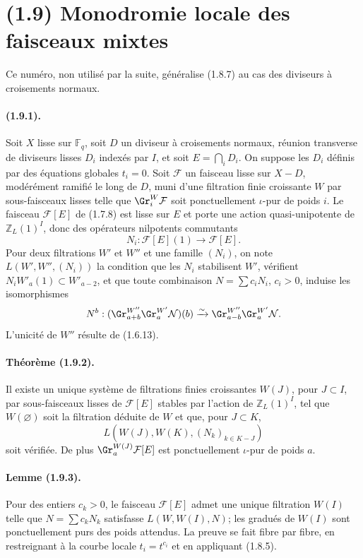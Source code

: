 
\section*{(1.9) Monodromie locale des faisceaux mixtes}

Ce numéro, non utilisé par la suite, généralise (1.8.7) au cas des diviseurs à croisements normaux.

\paragraph{(1.9.1).}
Soit $X$ lisse sur $\mathbb F_q$, soit $D$ un diviseur à croisements normaux, réunion transverse de diviseurs lisses $D_i$ indexés par $I$, et soit $E=\bigcap_iD_i$. On suppose les $D_i$ définis par des équations globales $t_i=0$. Soit $\mathcal F$ un faisceau lisse sur $X-D$, modérément ramifié le long de $D$, muni d'une filtration finie croissante $W$ par sous-faisceaux lisses telle que $\Gr_i^W\mathcal F$ soit ponctuellement $\iota$-pur de poids $i$. Le faisceau $\mathcal F[E]$ de (1.7.8) est lisse sur $E$ et porte une action quasi-unipotente de $\mathbb Z_L(1)^I$, donc des opérateurs nilpotents commutants
\[
N_i:\mathcal F[E](1)\to\mathcal F[E].
\]
Pour deux filtrations $W'$ et $W''$ et une famille $(N_i)$, on note $L(W',W'',(N_i))$ la condition que les $N_i$ stabilisent $W'$, vérifient $N_iW'_a(1)\subset W'_{a-2}$, et que toute combinaison $N=\sum c_iN_i$, $c_i>0$, induise les isomorphismes
\[
N^b:(\Gr^{W''}_{a+b}\Gr^{W'}_a\mathcal N)(b)\xrightarrow{\sim}\Gr^{W''}_{a-b}\Gr^{W'}_a\mathcal N.
\]
L'unicité de $W''$ résulte de (1.6.13).

\paragraph{Théorème (1.9.2).}
Il existe un unique système de filtrations finies croissantes $W(J)$, pour $J\subset I$, par sous-faisceaux lisses de $\mathcal F[E]$ stables par l'action de $\mathbb Z_L(1)^I$, tel que $W(\varnothing)$ soit la filtration déduite de $W$ et que, pour $J\subset K$,
\[
L(W(J),W(K),(N_k)_{k\in K-J})
\]
soit vérifiée. De plus $\Gr_a^{W(J)}\mathcal F[E]$ est ponctuellement $\iota$-pur de poids $a$.

\paragraph{Lemme (1.9.3).}
Pour des entiers $c_k>0$, le faisceau $\mathcal F[E]$ admet une unique filtration $W(I)$ telle que $N=\sum c_kN_k$ satisfasse $L(W,W(I),N)$; les gradués de $W(I)$ sont ponctuellement purs des poids attendus. La preuve se fait fibre par fibre, en restreignant à la courbe locale $t_i=t^{c_i}$ et en appliquant (1.8.5).

